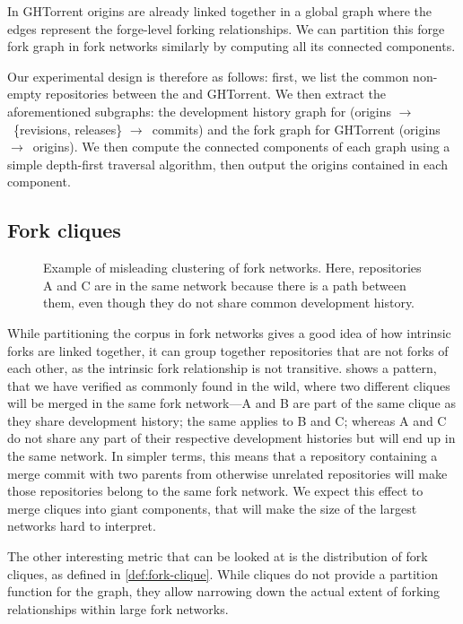 In GHTorrent origins are already linked together in a global graph where the
edges represent the forge-level forking relationships. We can partition this
forge fork graph in fork networks similarly by computing all its connected
components.

Our experimental design is therefore as follows: first, we list the common
non-empty repositories between the \SWHGD{} and GHTorrent. We then extract the
aforementioned subgraphs: the development history graph for \SWH{} (origins
$\to$~\{revisions, releases\} $\to$~commits) and the fork graph for GHTorrent
(origins $\to$~origins). We then compute the connected components of each graph
using a simple depth-first traversal algorithm, then output the origins
contained in each component.

\subsection{Fork cliques}%
\label{sec:methodology-fork-cliques}

\begin{figure}[t]
  \centering
  
  \caption{Example of misleading clustering of fork networks.  Here,
    repositories A and C are in the same network because there is a path
    between them, even though they do not share common development history.}%
  \label{fig:fork-transitive-fail}
\end{figure}

While partitioning the corpus in fork networks gives a good idea of how
intrinsic forks are linked together, it can group together repositories that
are not forks of each other, as the intrinsic fork relationship is not
transitive.  shows a pattern, that we
have verified as commonly found in the wild, where two different cliques will
be merged in the same fork network---A and B are part of the same clique as
they share development history; the same applies to B and C\@; whereas A and C
do not share any part of their respective development histories but will end up
in the same network. In simpler terms, this means that a repository containing
a merge commit with two parents from otherwise unrelated repositories will make
those repositories belong to the same fork network.  We expect this effect to
merge cliques into giant components, that will make the size of the largest
networks hard to interpret.

The other interesting metric that can be looked at is the distribution of fork
cliques, as defined in \cref{def:fork-clique}. While cliques do not
provide a partition function for the graph, they allow narrowing down the
actual extent of forking relationships within large fork networks.

